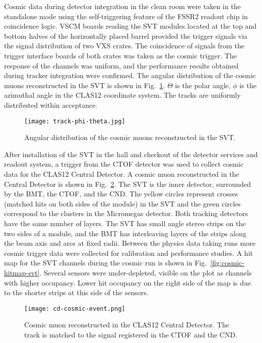 Cosmic data during detector integration in the clean room were taken in the standalone mode using the self-triggering feature of the FSSR2 readout chip in coincidence logic. VSCM boards reading the SVT modules located at the top and bottom halves of the horizontally placed barrel provided the trigger signals via the signal distribution of two VXS crates. The coincidence of  signals from the trigger interface boards of both crates was taken as the cosmic trigger. The response of the channels was uniform, and the performance results obtained during tracker integration were confirmed. The angular distribution of the cosmic muons reconstructed in the SVT is shown in Fig.~\ref{fig:track-phi-theta}. $\Theta$ is the polar angle, $\phi$ is the azimuthal angle in the CLAS12 coordinate system. The tracks are uniformly distributed within acceptance.

\begin{figure}[hbt] 
\centering 
\texttt{[image: track-phi-theta.jpg]}
\caption{Angular distribution of the cosmic muons reconstructed in the SVT.}
\label{fig:track-phi-theta}
\end{figure}

After installation of the SVT in the hall and checkout of the detector services and readout system, a trigger from the CTOF detector was used to collect cosmic data for the CLAS12 Central Detector. A cosmic muon reconstructed in the Central Detector is shown in Fig.~\ref{fig:cd-cosmic-event}. The SVT is the inner detector, surrounded by the BMT, the CTOF, and the CND. The yellow circles represent crosses (matched hits on both sides of the module) in the SVT and the green circles correspond to the clusters in the Micromegas detector. Both tracking detectors have the same number of layers. The SVT has small angle stereo strips on the two sides of a module, and the BMT has interleaving layers of the strips along the beam axis and arcs at fixed radii. Between the physics data taking runs more cosmic trigger data were collected for calibration and performance studies.  A hit map for the SVT channels during the cosmic run is shown in Fig.~\ref{fig:cosmic-hitmap-svt}. Several sensors were under-depleted, visible on the plot as channels with higher occupancy. Lower hit occupancy on the right side of the map is due to the shorter strips at this side of the sensors. 

\begin{figure}[hbt] 
\centering 
\texttt{[image: cd-cosmic-event.png]}
\caption{Cosmic muon reconstructed in the CLAS12 Central Detector. The track is matched to the signal registered in the CTOF and the CND.}
\label{fig:cd-cosmic-event}
\end{figure}

